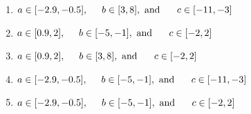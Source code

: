 \documentclass[14pt]{extbook}
\begin{document}
\begin{enumerate}
{\begin{center}
\end{center}
\begin{enumerate}[label=\Alph*.]
\item \( a \in [-2.9, -0.5], \hspace*{5mm} b \in [3, 8], \text{ and } \hspace*{5mm} c \in [-11, -3] \)
\item \( a \in [0.9, 2], \hspace*{5mm} b \in [-5, -1], \text{ and } \hspace*{5mm} c \in [-2, 2] \)
\item \( a \in [0.9, 2], \hspace*{5mm} b \in [3, 8], \text{ and } \hspace*{5mm} c \in [-2, 2] \)
\item \( a \in [-2.9, -0.5], \hspace*{5mm} b \in [-5, -1], \text{ and } \hspace*{5mm} c \in [-11, -3] \)
\item \( a \in [-2.9, -0.5], \hspace*{5mm} b \in [-5, -1], \text{ and } \hspace*{5mm} c \in [-2, 2] \)

\end{enumerate} }
\end{enumerate}
\end{document}
